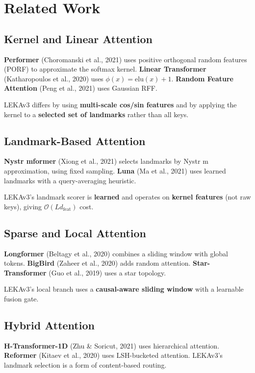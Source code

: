 \section{Related Work}

\subsection{Kernel and Linear Attention}

\textbf{Performer} (Choromanski et al., 2021) uses positive orthogonal random 
features (PORF) to approximate the softmax kernel. \textbf{Linear Transformer} 
(Katharopoulos et al., 2020) uses $\phi(x) = \text{elu}(x) + 1$. 
\textbf{Random Feature Attention} (Peng et al., 2021) uses Gaussian RFF.

LEKAv3 differs by using \textbf{multi-scale cos/sin features} and by applying 
the kernel to a \textbf{selected set of landmarks} rather than all keys.

\subsection{Landmark-Based Attention}

\textbf{Nystr mformer} (Xiong et al., 2021) selects landmarks by Nystr m 
approximation, using fixed sampling. \textbf{Luna} (Ma et al., 2021) uses 
learned landmarks with a query-averaging heuristic.

LEKAv3's landmark scorer is \textbf{learned} and operates on \textbf{kernel features} 
(not raw keys), giving $\mathcal{O}(L d_\text{feat})$ cost.

\subsection{Sparse and Local Attention}

\textbf{Longformer} (Beltagy et al., 2020) combines a sliding window with global 
tokens. \textbf{BigBird} (Zaheer et al., 2020) adds random attention. 
\textbf{Star-Transformer} (Guo et al., 2019) uses a star topology.

LEKAv3's local branch uses a \textbf{causal-aware sliding window} with a learnable 
fusion gate.

\subsection{Hybrid Attention}

\textbf{H-Transformer-1D} (Zhu \& Soricut, 2021) uses hierarchical attention. 
\textbf{Reformer} (Kitaev et al., 2020) uses LSH-bucketed attention. LEKAv3's 
landmark selection is a form of content-based routing.

